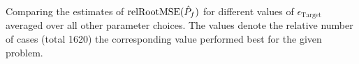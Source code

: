 Comparing the estimates of $\textup{relRootMSE}(\hat{P}_f)$ for different values of $\epsilon_{\text{Target}}$ averaged over  all other parameter choices. The values denote the relative number of cases (total 1620) the corresponding value performed best for the given problem.